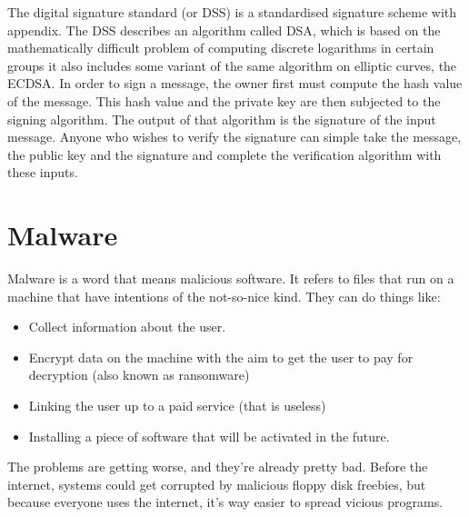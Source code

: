 \documentclass[11pt,a4paper,titlepage]{scrartcl}
\begin{document}
The digital signature standard (or DSS) is a standardised signature scheme
with appendix. The DSS describes an algorithm called DSA, which is based
on the mathematically difficult problem of computing discrete logarithms
in certain groups it also includes some variant of the same algorithm on
elliptic curves, the ECDSA. In order to sign a message, the owner first
must compute the hash value of the message. This hash value and the
private key are then subjected to the signing algorithm. The output of
that algorithm is the signature of the input message. Anyone who wishes to
verify the signature can simple take the message, the public key and the
signature and complete the verification algorithm with these inputs. 

\section{Malware}%
\label{sec:Malware}
Malware is a word that means malicious software. It refers to files that
run on a machine that have intentions of the not-so-nice kind. They can do
things like:
\begin{itemize}
    \item Collect information about the user.
    \item Encrypt data on the machine with the aim to get the user to pay
        for decryption (also known as ransomware)
    \item Linking the user up to a paid service (that is useless)
    \item Installing a piece of software that will be activated in the
        future.
\end{itemize}

The problems are getting worse, and they're already pretty bad. Before the
internet, systems could get corrupted by malicious floppy disk freebies,
but because everyone uses the internet, it's way easier to spread vicious
programs.
\end{document}
